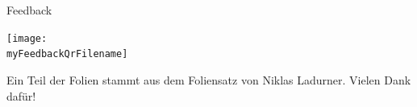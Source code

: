 \documentclass[
  german,            %
  aspectratio=169,    %
]{tumbeamer}
\begin{document}
\begin{frame}[c]{Feedback}{} 
  \begin{center}
    \texttt{[image: \\myFeedbackQrFilename]}
  \end{center}
  \begin{center}
    \LARGE \href{\myFeedbackLink}{\myFeedbackLink}
  \end{center}
  \vspace{0.5cm}
  \begin{center}
    \small Ein Teil der Folien stammt aus dem Foliensatz von Niklas Ladurner. Vielen Dank dafür!
  \end{center}
\end{frame}
\end{document}
